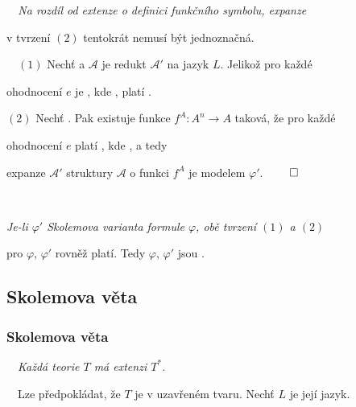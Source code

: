{\it {}\ \ Na rozdíl od extenze o definici funkčního symbolu, expanze
\smallskip

v tvrzení $(2)$ tentokrát nemusí být jednoznačná.}
\medskip

{\it {}}\ \ $(1)$ Nechť  a $\mathcal{A}$ je redukt $\mathcal{A}'$ na jazyk $L$. Jelikož pro každé
\smallskip

ohodnocení $e$ je , kde , platí .
\smallskip

$(2)$ Nechť . Pak existuje funkce $f^{A}\colon A^n \to A$ taková, že pro každé
\smallskip

ohodnocení $e$ platí , kde , a tedy
\smallskip

expanze $\mathcal{A'}$ struktury $\mathcal{A}$ o funkci $f^{A}$ je modelem $\varphi'$. $\qed$
\medskip

{\bf {}}\ \ {\it Je-li $\varphi'$ Skolemova varianta formule $\varphi$, obě tvrzení $(1)$ a $(2)$
\smallskip

pro $\varphi$, $\varphi'$ rovněž platí. Tedy $\varphi$, $\varphi'$ jsou .}



\subsection{Skolemova věta}\todo

\subsubsection*{Skolemova věta}
    
    {\bf {}}\ \ {\it Každá teorie $T$ má  extenzi $T^*$.}
    \medskip
    
    {\it {}}\ \ Lze předpokládat, že $T$ je v uzavřeném tvaru. Nechť $L$ je její jazyk.
    \vspace{0.5mm}
    
